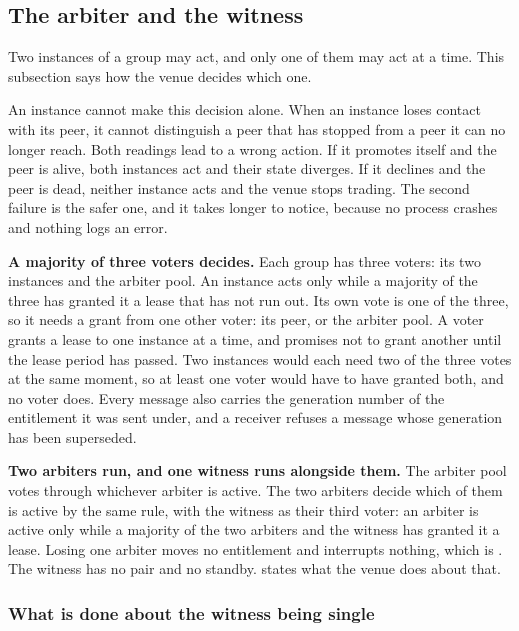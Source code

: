 \subsection{The arbiter and the witness}
\label{sec:ha:enabled:arbiter}

Two instances of a group may act, and only one of them may act at a time. This
subsection says how the venue decides which one.

An instance cannot make this decision alone. When an instance loses contact with
its peer, it cannot distinguish a peer that has stopped from a peer it can no
longer reach. Both readings lead to a wrong action. If it promotes itself and the
peer is alive, both instances act and their state diverges. If it declines and
the peer is dead, neither instance acts and the venue stops trading. The second
failure is the safer one, and it takes longer to notice, because no process
crashes and nothing logs an error.

\textbf{A majority of three voters decides.} Each group has three voters: its two
instances and the arbiter pool. An instance acts only while a majority of the
three has granted it a lease that has not run out. Its own vote is one of the
three, so it needs a grant from one other voter: its peer, or the arbiter pool. A
voter grants a lease to one instance at a time, and promises not to grant another
until the lease period has passed. Two instances would each need two of the three
votes at the same moment, so at least one voter would have to have granted both,
and no voter does. Every message also carries the generation number of the
entitlement it was sent under, and a receiver refuses a message whose generation
has been superseded.

\textbf{Two arbiters run, and one witness runs alongside them.} The arbiter pool
votes through whichever arbiter is active. The two arbiters decide which of them
is active by the same rule, with the witness as their third voter: an arbiter is
active only while a majority of the two arbiters and the witness has granted it a
lease. Losing one arbiter moves no entitlement and interrupts nothing, which is
. The witness has no pair and no standby.
 states what the venue does about that.

\subsubsection{What is done about the witness being single}
\label{sec:ha:enabled:arbiter:witness}

